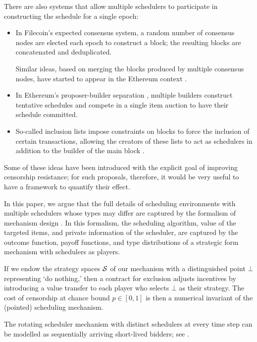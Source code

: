 There are also systems that allow multiple schedulers to participate in constructing the schedule for a single epoch:
%
\begin{itemize}

  \item 
    In Filecoin's expected consensus system, a random number of consensus nodes are elected each epoch to construct a block; the resulting blocks are concatenated and deduplicated.

    Similar ideas, based on merging the blocks produced by multiple consensus nodes, have started to appear in the Ethereum context \cite{FPR,burian2024censorship}.

  \item
    In Ethereum's proposer-builder separation \cite{thegostep2021mevboost}, multiple builders construct tentative schedules and compete in a single item auction to have their schedule committed.

  \item
    So-called inclusion lists impose constraints on blocks to force the inclusion of certain transactions, allowing the creators of these lists to act as schedulers in addition to the builder of the main block \cite{thomas2024forkchoice}.

\end{itemize}
%
Some of these ideas have been introduced with the explicit goal of improving censorship resistance; for such proposals, therefore, it would be very useful to have a framework to quantify their effect.

In this paper, we argue that the full details of scheduling environments with multiple schedulers whose types may differ are captured by the formalism of mechanism design \cite{milgrom2004putting}.
%
In this formalism, the scheduling algorithm, value of the targeted items, and private information of the scheduler, are captured by the outcome function, payoff functions, and type distributions of a strategic form mechanism with schedulers as players.

If we endow the strategy spaces $\mathcal{S}$ of our mechanism with a distinguished point $\bot$ representing `do nothing,' then a contract for exclusion adjusts incentives by introducing a value transfer to each player who selects $\bot$ as their strategy.
%
The cost of censorship at chance bound $p\in[0,1]$ is then a numerical invariant of the (pointed) scheduling mechanism.



\begin{example}

  The rotating scheduler mechanism with distinct schedulers at every time step can be modelled as sequentially arriving short-lived bidders; see \cite[Chap.~2]{gershkov2014dynamic}.

\end{example}

